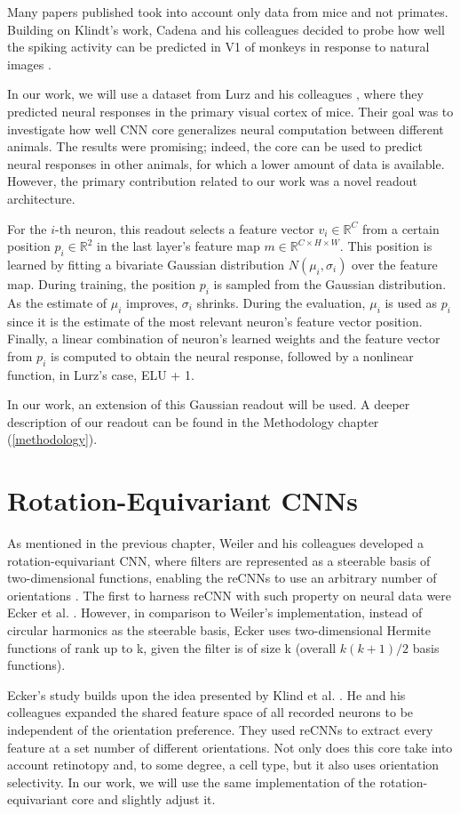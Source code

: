 Many papers published took into account only data from mice and not primates. Building on Klindt's work, Cadena and his colleagues decided to probe how well the spiking activity can be predicted in V1 of monkeys in response to natural images \citep{cadena2019deep}.

In our work, we will use a dataset from Lurz and his colleagues \citep{lurz2021generalization}, where they predicted neural responses in the primary visual cortex of mice. Their goal was to investigate how well CNN core generalizes neural computation between different animals. The results were promising; indeed, the core can be used to predict neural responses in other animals, for which a lower amount of data is available. However, the primary contribution related to our work was a novel readout architecture.

For the $i$-th neuron, this readout selects a feature vector $v_i \in \mathbb{R}^C$ from a certain position $p_i \in \mathbb{R}^2$ in the last layer’s feature map $m \in \mathbb{R}^{C \times H \times W}$. This position is learned by fitting a bivariate Gaussian distribution $N(\mu_i, \sigma_i)$ over the feature map. During training, the position $p_i$ is sampled from the Gaussian distribution. As the estimate of $\mu_i$ improves, $\sigma_i$ shrinks. During the evaluation, $\mu_i$ is used as $p_i$ since it is the estimate of the most relevant neuron’s feature vector position. Finally, a linear combination of neuron’s learned weights and the feature vector from $p_i$ is computed to obtain the neural response, followed by a nonlinear function, in Lurz’s case, ELU + 1.

In our work, an extension of this Gaussian readout will be used. A deeper description of our readout can be found in the Methodology chapter (\ref{methodology}).

\section{Rotation-Equivariant CNNs}

As mentioned in the previous chapter, Weiler and his colleagues developed a rotation-equivariant CNN, where filters are represented as a steerable basis of two-dimensional functions, enabling the reCNNs to use an arbitrary number of orientations \citep{weiler2018learning}. The first to harness reCNN with such property on neural data were Ecker et al. \citep{ecker2018rotation}. However, in comparison to Weiler’s implementation, instead of circular harmonics as the steerable basis, Ecker uses two-dimensional Hermite functions of rank up to k, given the filter is of size k (overall $k(k+1)/2$ basis functions).

Ecker’s study builds upon the idea presented by Klind et al. \citep{klindt2017neural}. He and his colleagues expanded the shared feature space of all recorded neurons to be independent of the orientation preference. They used reCNNs to extract every feature at a set number of different orientations. Not only does this core take into account retinotopy and, to some degree, a cell type, but it also uses orientation selectivity. In our work, we will use the same implementation of the rotation-equivariant core and slightly adjust it.


